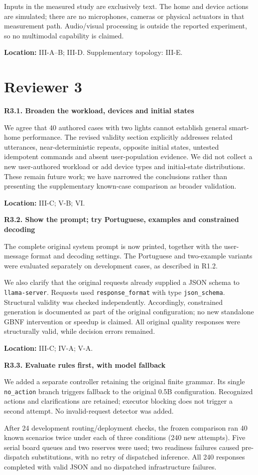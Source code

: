 \documentclass[11pt,a4paper]{article}
\newcommand{\point}[2]{\vspace{4pt}\textbf{#1. #2}\par}
\newcommand{\where}[1]{\par{\small\textcolor{ink}{\textbf{Location:} #1}}\par}
\begin{document}
Inputs in the measured study are exclusively text. The home and device actions are simulated; there are no microphones, cameras or physical actuators in that measurement path. Audio/visual processing is outside the reported experiment, so no multimodal capability is claimed.
\where{III-A--B; III-D. Supplementary topology: III-E.}

\newpage
\section*{Reviewer 3}
\point{R3.1}{Broaden the workload, devices and initial states}
We agree that 40 authored cases with two lights cannot establish general smart-home performance. The revised validity section explicitly addresses related utterances, near-deterministic repeats, opposite initial states, untested idempotent commands and absent user-population evidence. We did not collect a new user-authored workload or add device types and initial-state distributions. These remain future work; we have narrowed the conclusions rather than presenting the supplementary known-case comparison as broader validation.
\where{III-C; V-B; VI.}

\point{R3.2}{Show the prompt; try Portuguese, examples and constrained decoding}
The complete original system prompt is now printed, together with the user-message format and decoding settings. The Portuguese and two-example variants were evaluated separately on development cases, as described in R1.2.

We also clarify that the original requests already supplied a JSON schema to \texttt{llama-server}. Requests used \texttt{response\_format} with type \texttt{json\_schema}. Structural validity was checked independently. Accordingly, constrained generation is documented as part of the original configuration; no new standalone GBNF intervention or speedup is claimed. All original quality responses were structurally valid, while decision errors remained.
\where{III-C; IV-A; V-A.}

\point{R3.3}{Evaluate rules first, with model fallback}
We added a separate controller retaining the original finite grammar. Its single \texttt{no\_action} branch triggers fallback to the original 0.5B configuration. Recognized actions and clarifications are retained; executor blocking does not trigger a second attempt. No invalid-request detector was added.

After 24 development routing/deployment checks, the frozen comparison ran 40 known scenarios twice under each of three conditions (240 new attempts). Five serial board queues and two reserves were used; two readiness failures caused pre-dispatch substitutions, with no retry of dispatched inference. All 240 responses completed with valid JSON and no dispatched infrastructure failures.
\end{document}
